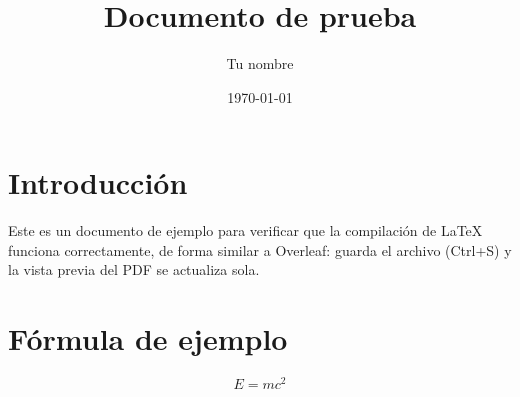 \documentclass[11pt]{article}
\title{Documento de prueba}
\author{Tu nombre}
\date{\today}
\begin{document}
\maketitle

\section{Introducci\'on}
Este es un documento de ejemplo para verificar que la compilaci\'on de \LaTeX{} funciona correctamente, de forma similar a Overleaf: guarda el archivo (Ctrl+S) y la vista previa del PDF se actualiza sola.

\section{F\'ormula de ejemplo}
\begin{equation}
  E = mc^2
\end{equation}
\end{document}
